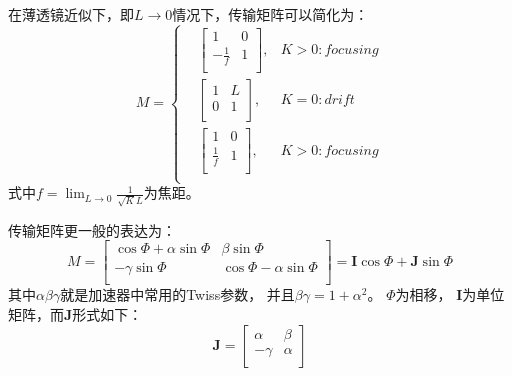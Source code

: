 在薄透镜近似下，即$L \rightarrow 0$情况下，传输矩阵可以简化为：
\begin{equation}
    \label{eq:Mathier_Hill_tranfermap_thinlen}
    M=\left\{
    \begin{aligned}
        &\begin{bmatrix}
          1              & 0  \\
         - \frac{1}{f}   & 1  \\
        \end{bmatrix}
        ,& K>0:focusing  \\
        &\begin{bmatrix}
          1 & L  \\
          0 & 1  \\
        \end{bmatrix}
        ,& K=0:drift  \\
        &\begin{bmatrix}
          1              & 0  \\
          \frac{1}{f}    & 1   \\
        \end{bmatrix}
        ,& K>0:focusing  \\
    \end{aligned}
    \right.
\end{equation}
式中$f=\lim_{L \rightarrow 0} \frac{1}{\sqrt{K}L}$为焦距。

传输矩阵更一般的表达为：
\begin{equation}
    \label{eq:Mathier_Hill_tranfermap2}
    M=
    \begin{bmatrix}
      \cos \Phi + \alpha \sin \Phi    & \beta \sin \Phi  \\
      -\gamma \sin \Phi  & \cos \Phi - \alpha \sin \Phi  \\
    \end{bmatrix}
    =
    \textbf{I} \cos \Phi + \textbf{J} \sin \Phi
\end{equation}
其中$\alpha$$\beta$$\gamma$就是加速器中常用的Twiss参数，
并且$\beta \gamma = 1+{\alpha}^2$。
$\Phi$为相移，
$\textbf{I}$为单位矩阵，而$\textbf{J}$形式如下：
\begin{equation}
    \label{eq:Mathier_Hill_tranfermap3}
    \textbf{J}=
    \begin{bmatrix}
      \alpha    & \beta  \\
      -\gamma   & \alpha \\
    \end{bmatrix}
\end{equation}


